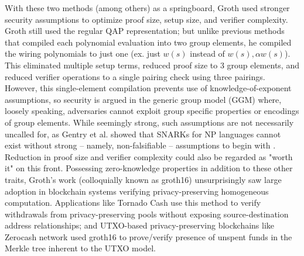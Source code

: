 \noindent With these two methods (among others) as a springboard, Groth \cite{groth16} used stronger security assumptions to optimize proof size, setup size, and verifier complexity. Groth still used the regular QAP representation; but unlike previous methods that compiled each polynomial evaluation into two group elements, he compiled the wiring polynomials to just one (ex. just $w(s)$ instead of $w(s), \alpha w(s)$). This eliminated multiple setup terms, reduced proof size to 3 group elements, and reduced verifier operations to a single pairing check using three pairings. However, this single-element compilation prevents use of knowledge-of-exponent assumptions, so security is argued in the generic group model (GGM) \cite{ggmlower} where, loosely speaking, adversaries cannot exploit group specific properties or encodings of group elements. While seemingly strong, such assumptions are not necessarily uncalled for, as Gentry et al. showed that SNARKs for NP languages cannot exist without strong -- namely, non-falsifiable -- assumptions to begin with \cite{nonfalsifiable}. Reduction in proof size and verifier complexity could also be regarded as "worth it" on this front. Possessing zero-knowledge properties in addition to these other traits, Groth's work (colloquially known as groth16) unsurprisingly saw large adoption in blockchain systems verifying privacy-preserving homogeneous computation. Applications like Tornado Cash \cite{tornadocash} use this method to verify withdrawals from privacy-preserving pools without exposing source-destination address relationships; and UTXO-based privacy-preserving blockchains like Zerocash network \cite{zcash} used groth16 to prove/verify presence of unspent funds in the Merkle tree inherent to the UTXO model. 


